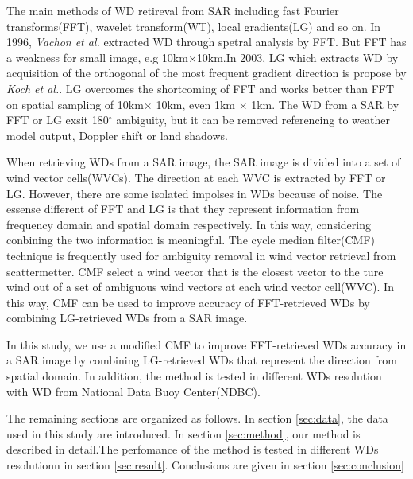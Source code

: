 \documentclass{article}
\begin{document}
The main methods of WD retireval from SAR including fast Fourier transforms(FFT)\cite{Vachon:1996uj}, wavelet transform(WT)\cite{Du:2003ga}, local gradients(LG) and so on. In 1996, {\it Vachon et al.} extracted WD through spetral analysis by FFT. But FFT has a weakness for small image, e.g 10km$\times$10km\cite{Zhou:2017ec}.In 2003, LG which extracts WD by acquisition of the orthogonal of the most frequent gradient direction is propose by {\it Koch et al.}. LG overcomes the shortcoming of FFT and works better than FFT on spatial sampling of 10km$\times$ 10km, even 1km $\times$ 1km. The WD from a SAR by FFT or LG exsit 180$^\circ$ ambiguity, but it can be removed referencing to weather model output, Doppler shift or land shadows\cite{Horstmann:2003eg,Zhang:2014cr}.

When retrieving WDs from a SAR image, the SAR image is divided into a set of wind vector cells(WVCs). The direction at each WVC is extracted by FFT or LG. However, there are some isolated impolses in WDs because of noise. The essense different of FFT and LG is that they represent information from frequency domain and spatial domain respectively. In this way, considering conbining the two information is meaningful. The cycle median filter(CMF) technique is frequently used for ambiguity removal in wind vector retrieval from scattermetter\cite{Shaffer:1991ei,Stiles:2002cq}. CMF select a  wind vector that is the closest vector to the ture wind out of a set of ambiguous wind vectors at each wind vector cell(WVC)\cite{Shaffer:1991ei}. In this way, CMF can be used to improve accuracy of FFT-retrieved WDs by combining LG-retrieved WDs from a SAR image. 

In this study, we use a modified CMF to improve FFT-retrieved WDs accuracy in a SAR image by combining LG-retrieved WDs that represent the direction from spatial domain. In addition, the method is tested in different WDs resolution with WD from National Data Buoy Center(NDBC).

The remaining sections are organized as follows. In section \ref{sec:data}, the data used in this study are introduced. In section \ref{sec:method}, our method is described in detail.The perfomance of the method is tested in different WDs resolutionn in section \ref{sec:result}. Conclusions are given in section \ref{sec:conclusion}
\end{document}
